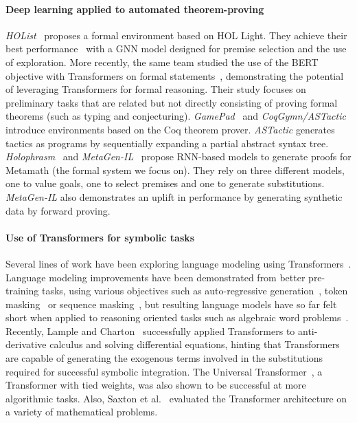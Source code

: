 \documentclass{article}
\begin{document}
\paragraph{Deep learning applied to automated theorem-proving} \textit{HOList}~\cite{bansal2019holist} proposes a formal environment based on HOL Light. They achieve their best performance~\cite{bansal2019learning} with a GNN model designed for premise selection and the use of exploration. More recently, the same team studied the use of the BERT objective with Transformers on formal statements~\cite{rabe2020language}, demonstrating the potential of leveraging Transformers for formal reasoning. Their study focuses on preliminary tasks that are related but not directly consisting of proving formal theorems (such as typing and conjecturing). \textit{GamePad}~\cite{huang2018gamepad} and \textit{CoqGymn/ASTactic}~\cite{yang2019learning} introduce environments based on the Coq theorem prover. \textit{ASTactic} generates tactics as programs by sequentially expanding a partial abstract syntax tree. \textit{Holophrasm}~\cite{whalen2016holophrasm} and \textit{MetaGen-IL}~\cite{wang2020learning} propose RNN-based models to generate proofs for Metamath (the formal system we focus on). They rely on three different models, one to value goals, one to select premises and one to generate substitutions. \textit{MetaGen-IL} also demonstrates an uplift in performance by generating synthetic data by forward proving. 

\paragraph{Use of Transformers for symbolic tasks} Several lines of work have been exploring language modeling using Transformers~\cite{vaswani2017attention}. Language modeling improvements have been demonstrated from better pre-training tasks, using various objectives such as auto-regressive generation~\cite{radford2018improving,radford2019language,brown2020language}, token masking~\cite{devlin2018bert} or sequence masking~\cite{raffel2019exploring}, but resulting language models have so far felt short when applied to reasoning oriented tasks such as algebraic word problems~\cite{ling2017program,amini2019mathqa}. Recently, Lample and Charton~\cite{lample2019deep} successfully applied Transformers to anti-derivative calculus and solving differential equations, hinting that Transformers are capable of generating the exogenous terms involved in the substitutions required for successful symbolic integration. The Universal Transformer~\cite{dehghani2018universal}, a Transformer with tied weights, was also shown to be successful at more algorithmic tasks. Also, Saxton et al.~\cite{saxton2019analysing} evaluated the Transformer architecture on a variety of mathematical problems.
\end{document}
